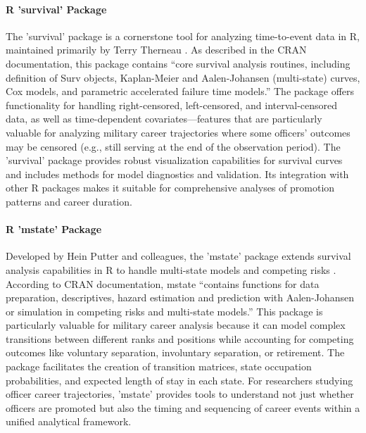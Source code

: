 \documentclass[../main.tex]{subfiles}
\begin{document}
\paragraph{R 'survival' Package}
The 'survival' package is a cornerstone tool for analyzing time-to-event data in R, maintained primarily by Terry Therneau \citep{r_survival}. As described in the CRAN documentation, this package contains ``core survival analysis routines, including definition of Surv objects, Kaplan-Meier and Aalen-Johansen (multi-state) curves, Cox models, and parametric accelerated failure time models.'' The package offers functionality for handling right-censored, left-censored, and interval-censored data, as well as time-dependent covariates—features that are particularly valuable for analyzing military career trajectories where some officers' outcomes may be censored (e.g., still serving at the end of the observation period). The 'survival' package provides robust visualization capabilities for survival curves and includes methods for model diagnostics and validation. Its integration with other R packages makes it suitable for comprehensive analyses of promotion patterns and career duration.

\paragraph{R 'mstate' Package}
Developed by Hein Putter and colleagues, the 'mstate' package extends survival analysis capabilities in R to handle multi-state models and competing risks \citep{putter2024}. According to CRAN documentation, mstate ``contains functions for data preparation, descriptives, hazard estimation and prediction with Aalen-Johansen or simulation in competing risks and multi-state models.'' This package is particularly valuable for military career analysis because it can model complex transitions between different ranks and positions while accounting for competing outcomes like voluntary separation, involuntary separation, or retirement. The package facilitates the creation of transition matrices, state occupation probabilities, and expected length of stay in each state. For researchers studying officer career trajectories, 'mstate' provides tools to understand not just whether officers are promoted but also the timing and sequencing of career events within a unified analytical framework.
\end{document}
